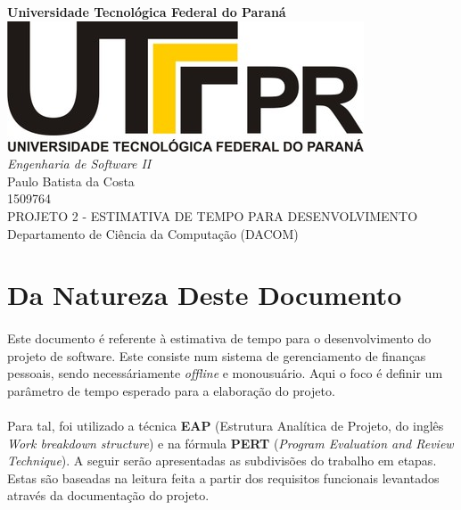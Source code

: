 \documentclass[12pt,a4paper]{article}
\author{Paulo Batista da Costa}
\title{}
\begin{document}
		
	        \begin{titlepage}
	        \LARGE
	        	\begin{center}
	        	\vspace{5cm} 
	        	\textbf{Universidade Tecnológica Federal do Paraná \\ \vspace{1.8cm}}
	        	\includegraphics[scale=0.35]{logoutfpr.jpg} \\ \vspace{1.8cm}
	        	\textit{Engenharia de Software II} \vspace{2cm} \\
	        	Paulo Batista da Costa \\ 1509764 \vspace{2cm} \\ 
	        	PROJETO 2 - ESTIMATIVA DE TEMPO PARA DESENVOLVIMENTO\vspace{2cm} \\
	        	Departamento de Ciência da Computação (DACOM) 
	        	
	        	\end{center}
	        \end{titlepage}	
		
			\tableofcontents
			
			
			\newpage
			\section{Da Natureza Deste Documento}
			\paragraph{} Este documento é referente à estimativa de tempo para o desenvolvimento do projeto de software. Este consiste num sistema de gerenciamento de finanças pessoais, sendo necessáriamente \textit{offline} e monousuário. Aqui o foco é definir um parâmetro de tempo esperado para a elaboração do projeto.
	
	\paragraph{} Para tal, foi utilizado a técnica \textbf{EAP} (Estrutura Analítica de Projeto, do inglês \textit{Work breakdown structure}) e na fórmula \textbf{PERT} (\textit{Program Evaluation and Review Technique}). A seguir serão apresentadas as subdivisões do trabalho em etapas. Estas são baseadas na leitura feita a partir dos requisitos funcionais levantados através da documentação do projeto. 
\end{document}
